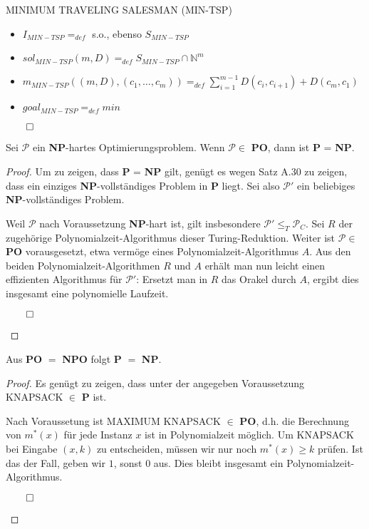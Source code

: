 \begin{example} 
	MINIMUM TRAVELING SALESMAN (MIN-TSP)
	\begin{itemize}
		\item $I_{MIN-TSP} =_{def}$ s.o., ebenso $S_{MIN-TSP}$
		\item $sol_{MIN-TSP}(m,D) =_{def} S_{MIN-TSP} \cap \mathbb{N}^m$ 
		\item $m_{MIN-TSP}((m,D),(c_1, \ldots , c_m)) =_{def} \sum_{i=1}^{m-1} D(c_i, c_{i+1}) + D(c_m,c_1)$ 
		\item $goal_{MIN-TSP} =_{def} min$
	\end{itemize}
	\begin{flushright}
	$\qed$
	\end{flushright}
\end{example}

\begin{theorem} 
	Sei $\mathcal{P}$ ein \textbf{NP}-hartes Optimierungsproblem.
	Wenn $\mathcal{P} \in$ \textbf{PO}, dann ist \textbf{P} = \textbf{NP}.
\end{theorem}

\begin{proof} 
	Um zu zeigen, dass \textbf{P} = \textbf{NP} gilt, genügt es wegen Satz A.30 zu zeigen, dass ein einziges \textbf{NP}-vollständiges Problem in \textbf{P} liegt. Sei also $\mathcal{P}'$ ein beliebiges \textbf{NP}-vollständiges Problem.

	Weil $\mathcal{P}$ nach Voraussetzung \textbf{NP}-hart ist, gilt insbesondere $\mathcal{P}' \leq_T \mathcal{P}_C$. Sei $R$ der zugehörige Polynomialzeit-Algorithmus dieser Turing-Reduktion. Weiter ist $\mathcal{P} \in$ \textbf{PO} vorausgesetzt, etwa vermöge eines Polynomialzeit-Algorithmus $A$. Aus den beiden Polynomialzeit-Algorithmen $R$ und $A$ erhält man nun leicht einen effizienten Algorithmus für $\mathcal{P}'$: Ersetzt man in $R$ das Orakel durch $A$, ergibt dies insgesamt eine polynomielle Laufzeit. 
	\begin{flushright}
		$\qed$
	\end{flushright}
\end{proof}

\begin{lemma} 
	Aus \textbf{PO} $=$ \textbf{NPO} folgt \textbf{P} $=$ \textbf{NP}.
\end{lemma}

\begin{proof} 
	Es genügt zu zeigen, dass unter der angegeben Voraussetzung KNAPSACK $\in$ \textbf{P} ist.

	Nach Voraussetung ist MAXIMUM KNAPSACK $\in$ \textbf{PO}, d.h. die Berechnung von $m^*(x)$ für jede Instanz $x$ ist in Polynomialzeit möglich. Um KNAPSACK bei Eingabe $(x,k)$ zu entscheiden, müssen wir nur noch $m^*(x) \geq k$ prüfen. Ist das der Fall, geben wir $1$, sonst $0$ aus. Dies bleibt insgesamt ein Polynomialzeit-Algorithmus. 
	\begin{flushright}
		$\qed$
	\end{flushright}
\end{proof}

